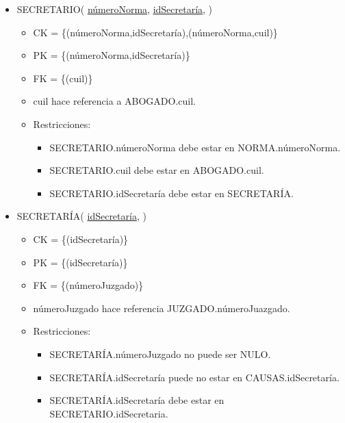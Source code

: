 \begin{itemize}
	
\item SECRETARIO( \underline{númeroNorma}, \underline{idSecretaría}, )
	\begin{itemize}
		\item CK = \{(númeroNorma,idSecretaría),(númeroNorma,cuil)\}
		\item PK = \{(númeroNorma,idSecretaría)\}
		\item FK = \{(cuil)\}
		\item cuil hace referencia a ABOGADO.cuil.
		\item Restricciones:
			\begin{itemize}
			\item SECRETARIO.númeroNorma debe estar en NORMA.númeroNorma.
			\item SECRETARIO.cuil debe estar en ABOGADO.cuil.
			\item SECRETARIO.idSecretaría debe estar en SECRETARÍA.
			\\
			\end{itemize}
	\end{itemize}


\item SECRETARÍA( \underline{idSecretaría}, )
	\begin{itemize}
		\item CK = \{(idSecretaría)\}
		\item PK = \{(idSecretaría)\}
		\item FK = \{(númeroJuzgado)\}
		\item númeroJuzgado hace referencia JUZGADO.númeroJuazgado.
		\item Restricciones:
			\begin{itemize}
			\item SECRETARÍA.númeroJuzgado no puede ser NULO.
			\item SECRETARÍA.idSecretaría puede no estar en CAUSAS.idSecretaría.
			\item SECRETARÍA.idSecretaría debe estar en SECRETARIO.idSecretaria.
			\\
			\end{itemize}
	\end{itemize}


\end{itemize}
